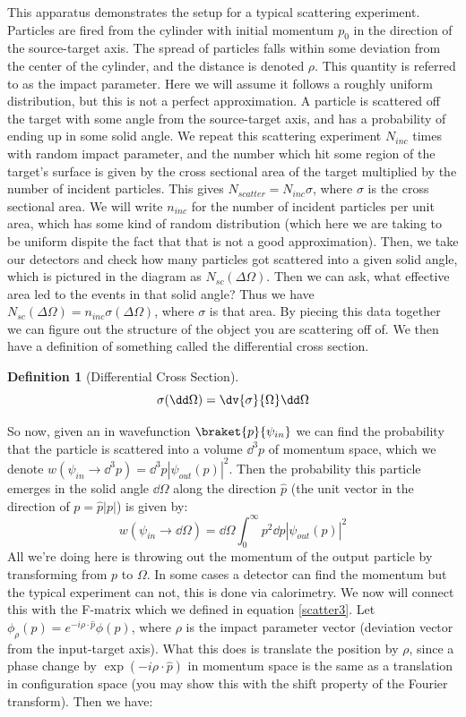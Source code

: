 \documentclass{article}
\newtheorem{defn}{Definition}
\begin{document}
This apparatus demonstrates the setup for a typical scattering experiment. Particles are fired from the cylinder with initial momentum $p_0$ in the direction of the source-target axis. The spread of particles falls within some deviation from the center of the cylinder, and the distance is denoted $\rho$. This quantity is referred to as the impact parameter. Here we will assume it follows a roughly uniform distribution, but this is not a perfect approximation. A particle is scattered off the target with some angle from the source-target axis, and has a probability of ending up in some solid angle. We repeat this scattering experiment $N_{inc}$ times with random impact parameter, and the number which hit some region of the target's surface is given by the cross sectional area of the target multiplied by the number of incident particles. This gives $N_{scatter} = N_{inc} \sigma$, where $\sigma$ is the cross sectional area. We will write $n_{inc}$ for the number of incident particles per unit area, which has some kind of random distribution (which here we are taking to be uniform dispite the fact that that is not a good approximation). Then, we take our detectors and check how many particles got scattered into a given solid angle, which is pictured in the diagram as $N_{sc}(\Delta \Omega)$. Then we can ask, what effective area led to the events in that solid angle? Thus we have $N_{sc}(\Delta\Omega) = n_{inc} \sigma(\Delta\Omega)$, where $\sigma$ is that area. By piecing this data together we can figure out the structure of the object you are scattering off of. We then have a definition of something called the differential cross section.
\begin{defn}[Differential Cross Section]
\begin{equation}\sigma(\dd \Omega) = \dv{\sigma}{\Omega}\dd \Omega\end{equation}
\end{defn}
So now, given an in wavefunction $\braket{p}{\psi_{in}}$ we can find the probability that the particle is scattered into a volume $\dd^3 p$ of momentum space, which we denote $w(\psi_{in}\to \dd^3 p) = \dd^3 p |\psi_{out}(p)|^2$. Then the probability this particle emerges in the solid angle $\dd \Omega$ along the direction $\hat p$ (the unit vector in the direction of $p = \hat p |p|$) is given by:
\begin{equation}\label{scatter4}w(\psi_{in} \to \dd \Omega) = \dd \Omega \int_0^\infty p^2 \dd p |\psi_{out}(p)|^2\end{equation}
All we're doing here is throwing out the momentum of the output particle by transforming from $p$ to $\Omega$. In some cases a detector can find the momentum but the typical experiment can not, this is done via calorimetry. We now will connect this with the F-matrix which we defined in equation \eqref{scatter3}. Let $\phi_\rho(p) = e^{-i\rho\cdot \hat p} \phi(p)$, where $\rho$ is the impact parameter vector (deviation vector from the input-target axis). What this does is translate the position by $\rho$, since a phase change by $\exp(-i\rho\cdot \hat p)$ in momentum space is the same as a translation in configuration space (you may show this with the shift property of the Fourier transform). Then we have:
\end{document}
